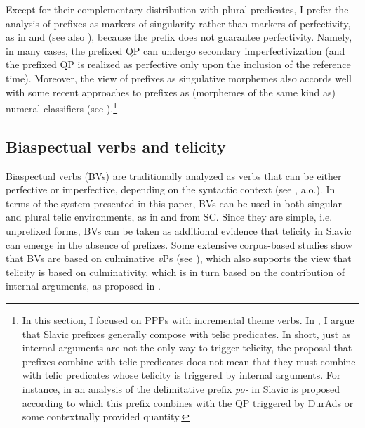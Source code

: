 \documentclass[output=paper,colorlinks,citecolor=brown]{langscibook}
\begin{document}
\noindent Except for their complementary distribution with plural predicates, I prefer the analysis of prefixes as markers of singularity rather than markers of perfectivity, as in \citet{Krifka1992} and \citet{Verkuyl1999} (see also \citealt{Slabakova2005}), because the prefix does not guarantee perfectivity. Namely, in many cases, the prefixed QP can undergo secondary imperfectivization (and the prefixed QP is realized as perfective only upon the inclusion of the reference time). Moreover, the view of prefixes as singulative morphemes also accords well with some recent approaches to prefixes as (morphemes of the same kind as) numeral classifiers (see \citealt{DickeyJanda2015}).\footnote{In this section, I focused on PPPs with incremental theme verbs. In  \citet[]{Milosavljević2022, Milosavljević_in_prep}, I argue that Slavic prefixes generally compose with telic predicates. In short, just as internal arguments are not the only way to trigger telicity, the proposal that prefixes combine with telic predicates does not mean that they must combine with telic predicates whose telicity is triggered by internal arguments. For instance, in \citet[]{Milosavljević2022, Milosavljević_in_prep} an analysis of the delimitative prefix \textit{po-} in Slavic is proposed according to which this prefix combines with the QP triggered by DurAds or some contextually provided quantity.}

\subsection{Biaspectual verbs and telicity} \label{mil:sec:BiaspectualVerbs}

Biaspectual verbs (BVs) are traditionally analyzed as verbs that can be either perfective or imperfective, depending on the syntactic context (see \citealt{Janda2007What, Kolaković2018, Zinova2021, Stary2017}, a.o.). In terms of the system presented in this paper, BVs can be used in both singular and plural telic environments, as in  and  from SC. Since they are simple, i.e. unprefixed forms, BVs can be taken as additional evidence that telicity in Slavic can emerge in the absence of prefixes. Some extensive corpus-based studies show that BVs are based on culminative \textit{v}Ps (see \citealt{Grickat1957/8, Janda2007What, Kolaković2018}), which also supports the view that telicity is based on culminativity, which is in turn based on the contribution of internal arguments, as proposed in . 
\end{document}

